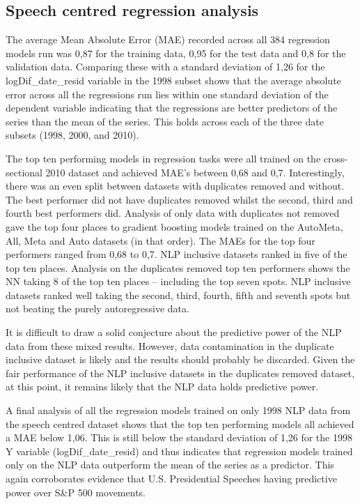 \documentclass[11pt,preprint, authoryear]{elsarticle}
\numberwithin{equation}{section}
\numberwithin{figure}{section}
\numberwithin{table}{section}
\begin{document}
\hypertarget{speech-centred-regression-analysis}{%
\subsection{Speech centred regression
analysis}\label{speech-centred-regression-analysis}}

The average Mean Absolute Error (MAE) recorded across all 384 regression
models run was 0,87 for the training data, 0,95 for the test data and
0,8 for the validation data. Comparing these with a standard deviation
of 1,26 for the logDif\_date\_resid variable in the 1998 subset shows
that the average absolute error across all the regressions run lies
within one standard deviation of the dependent variable indicating that
the regressions are better predictors of the series than the mean of the
series. This holds across each of the three date subsets (1998, 2000,
and 2010).

The top ten performing models in regression tasks were all trained on
the cross-sectional 2010 dataset and achieved MAE's between 0,68 and
0,7. Interestingly, there was an even split between datasets with
duplicates removed and without. The best performer did not have
duplicates removed whilst the second, third and fourth best performers
did. Analysis of only data with duplicates not removed gave the top four
places to gradient boosting models trained on the AutoMeta, All, Meta
and Auto datasets (in that order). The MAEs for the top four performers
ranged from 0,68 to 0,7. NLP inclusive datasets ranked in five of the
top ten places. Analysis on the duplicates removed top ten performers
shows the NN taking 8 of the top ten places -- including the top seven
spots. NLP inclusive datasets ranked well taking the second, third,
fourth, fifth and seventh spots but not beating the purely
autoregressive data.

It is difficult to draw a solid conjecture about the predictive power of
the NLP data from these mixed results. However, data contamination in
the duplicate inclusive dataset is likely and the results should
probably be discarded. Given the fair performance of the NLP inclusive
datasets in the duplicates removed dataset, at this point, it remains
likely that the NLP data holds predictive power.

A final analysis of all the regression models trained on only 1998 NLP
data from the speech centred dataset shows that the top ten performing
models all achieved a MAE below 1,06. This is still below the standard
deviation of 1,26 for the 1998 Y variable (logDif\_date\_resid) and thus
indicates that regression models trained only on the NLP data outperform
the mean of the series as a predictor. This again corroborates evidence
that U.S. Presidential Speeches having predictive power over S\&P 500
movements.
\end{document}

